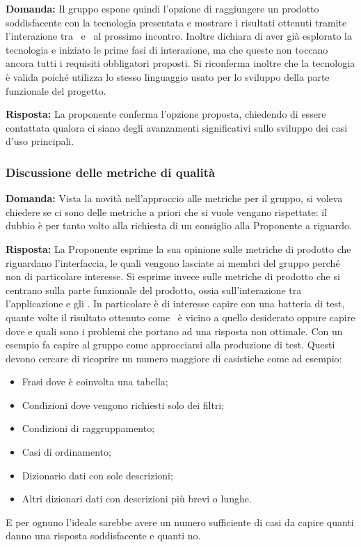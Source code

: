 \par \textbf{Domanda:} Il gruppo espone quindi l'opzione di raggiungere un prodotto soddisfacente con la tecnologia presentata e mostrare i risultati ottenuti tramite l'interazione tra \ e \ al prossimo incontro. 
Inoltre dichiara di aver già esplorato la tecnologia e iniziato le prime fasi di interazione, ma che queste non toccano ancora tutti i requisiti obbligatori proposti. 
Si riconferma inoltre che la tecnologia è valida poiché utilizza lo stesso linguaggio usato per lo sviluppo della parte funzionale del progetto.

\par \textbf{Risposta:} La proponente conferma l'opzione proposta, chiedendo di essere contattata qualora ci siano degli avanzamenti significativi sullo sviluppo dei casi d'uso principali.

\subsubsection{Discussione delle metriche di qualità}

\par \textbf{Domanda:} Vista la novità nell'approccio alle metriche per il gruppo, si voleva chiedere se ci sono delle metriche a priori che si vuole vengano rispettate: il dubbio è per tanto volto alla richiesta di un consiglio alla Proponente a riguardo.

\par \textbf{Risposta:} La Proponente esprime la sua opinione sulle metriche di prodotto che riguardano l'interfaccia, le quali vengono lasciate ai membri del gruppo perché non di particolare interesse.
Si esprime invece sulle metriche di prodotto che si centrano sulla parte funzionale del prodotto, ossia sull'interazione tra l'applicazione e gli . 
In particolare è di interesse capire con una batteria di test, quante volte il risultato ottenuto come \ è vicino a quello desiderato oppure capire dove e quali sono i problemi che portano ad una risposta non ottimale.
Con un esempio fa capire al gruppo come approcciarsi alla produzione di test. 
Questi devono cercare di ricoprire un numero maggiore di casistiche come ad esempio:
\begin{itemize}
	\item Frasi dove è coinvolta una tabella;
	\item Condizioni dove vengono richiesti solo dei filtri;
	\item Condizioni di raggruppamento;
	\item Casi di ordinamento;
	\item Dizionario dati con sole descrizioni;
	\item Altri dizionari dati con descrizioni più brevi o lunghe.
\end{itemize}
E per ognuno l'ideale sarebbe avere un numero sufficiente di casi da capire quanti danno una risposta soddisfacente e quanti no.

